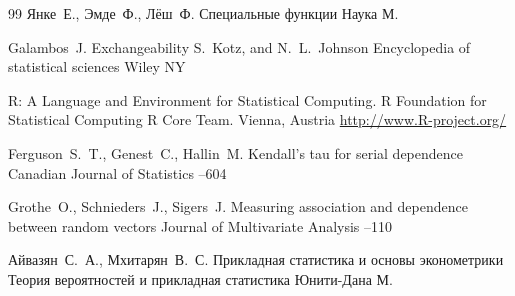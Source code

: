 \begin{thebibliography}{99}
\by Янке~Е., Эмде~Ф., Лёш~Ф.
\book Специальные функции
\publ Наука
\publaddr М.

\by  Galambos~J.
\paper Exchangeability
\eds S.~Kotz, and N.~L.~Johnson 
\inbook Encyclopedia of statistical sciences
\publ Wiley
\publaddr NY


\preprint R: A Language and Environment for Statistical Computing. \rm  R Foundation for Statistical Computing
\by R Core Team.
\publaddr Vienna, Austria
\elink \url{http://www.R-project.org/}



\by  Ferguson~S.~T., Genest~C., Hallin~M. 
\paper Kendall’s tau for serial dependence
\jour Canadian Journal of Statistics
–604 


\by   Grothe~O.,  Schnieders~J., Sigers~J.
\paper Measuring association and dependence between random vectors
\jour Journal of Multivariate Analysis
--110 

\by   Айвазян~С.~А., Мхитарян~В.~С.
\book Прикладная статистика и основы эконометрики
\volinfo Теория вероятностей и прикладная статистика
\publ Юнити-Дана
\publaddr М.
  
\end{thebibliography}

\newpage


\makeentitle







